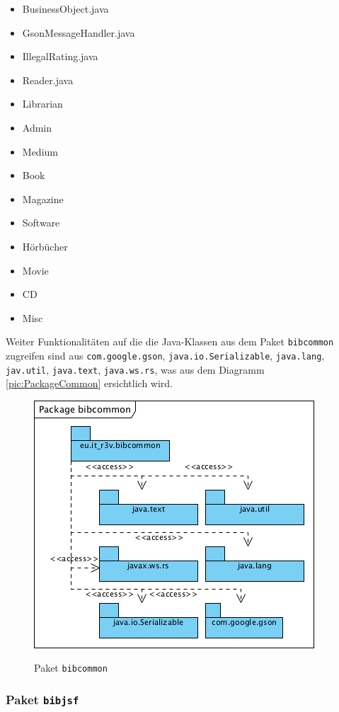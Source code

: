 \documentclass[fontsize=12pt,paper=a4,twoside]{scrartcl}
\begin{document}
\begin{itemize}
\item{BusinessObject.java}
\item{GsonMessageHandler.java}
\item{IllegalRating.java}
\item{Reader.java}
\item{Librarian}
\item{Admin}
\item{Medium}
\item{Book}
\item{Magazine}
\item{Software}
\item{Hörbücher}
\item{Movie}
\item{CD}
\item{Misc}
\end{itemize}

Weiter Funktionalitäten auf die die Java-Klassen aus dem Paket \texttt{bibcommon} zugreifen sind aus \texttt{com.google.gson}, \texttt{java.io.Serializable}, \texttt{java.lang}, \texttt{jav.util}, \texttt{java.text}, \texttt{java.ws.rs}, was aus dem Diagramm \vref{pic:PackageCommon} ersichtlich wird.

\begin{figure} [H] 
\caption{Paket \texttt{bibcommon}} \centering
 \includegraphics[scale=2]{Diagramme/Packagebibcommon.png} 
 \label{pic:PackageCommon} 
\end{figure}


\newpage
\subsubsection{Paket \texttt{bibjsf}}
\label{sec:bibclient}
\end{document}
